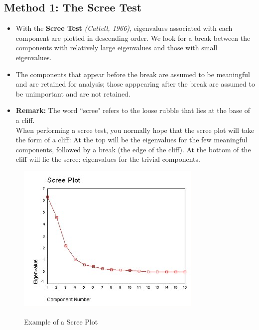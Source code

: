 \documentclass[a4paper,12pt]{article}
\begin{document}
\subsection{Method 1: The Scree Test} 
\begin{itemize}
	\item With the \textbf{Scree Test} \textit{(Cattell, 1966)}, eigenvalues associated with
	each component are plotted in descending order. We look for a break between the components with relatively large
	eigenvalues and those with small eigenvalues.
	
%	
	\item   The components that appear before the break are
	assumed to be meaningful and are retained for analysis; those apppearing after the break are
	assumed to be unimportant and are not retained.
	
	\item \textbf{Remark:} The word ``scree" refers to the loose rubble that lies at
	the base of a cliff.\\ \smallskip  When performing a scree test, you normally hope that the scree plot
	will take the form of a cliff:  At the top will be the eigenvalues for the few meaningful
	components, followed by a break (the edge of the cliff).  At the bottom of the cliff will lie
	the scree:  eigenvalues for the trivial components.
\end{itemize}

\begin{figure}[h!]
	\begin{center}
		\includegraphics[scale=0.9]{3AScree1.jpg}\\
		\caption{Example of a Scree Plot}\label{Scree Plot}
	\end{center}
	
\end{figure}
\end{document}
